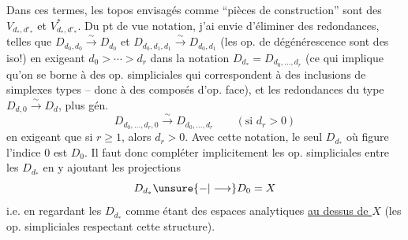 Dans ces termes, les topos envisagés comme ``pièces de construction'' sont des $V_{d_*,d'_*}$ et $V^*_{d_*,d'_*}$.
Du pt de vue notation, j'ai envie d'éliminer des redondances, telles que $D_{d_0,d_0}\xrightarrow{\sim}D_{d_0}$ et $D_{d_0,d_1,d_1}\xrightarrow{\sim}D_{d_0,d_1}$ (les op.  de dégénérescence sont des iso!) en exigeant $d_0>\cdots>d_r$ dans la notation $D_{d_*}=D_{d_0,\ldots,d_r}$ (ce qui implique qu'on se borne à des op. simpliciales qui correspondent à des inclusions de simplexes types -- donc à des composés d'op. face),  et les redondances du type $D_{d,0}\xrightarrow{\sim}D_d$, plus gén.
\[
D_{d_0,\ldots,d_r,0}\xrightarrow{\sim}D_{d_0,\ldots,d_r}\qquad(\text{si }d_r>0)
\]
en exigeant que si $r\geq1$, alors $d_r>0$. Avec cette notation, le seul $D_{d_*}$ où figure l'indice $0$ est $D_0$. Il faut donc compléter implicitement les op. simpliciales entre les $D_{d_*}$ en y ajoutant les projections
\[
D_{d_*}\unsure{-|\longrightarrow}D_0=X
\]
i.e. en regardant les $D_{d_*}$ comme étant des espaces analytiques \uline{au dessus de $X$} (les op. simpliciales respectant cette structure).

